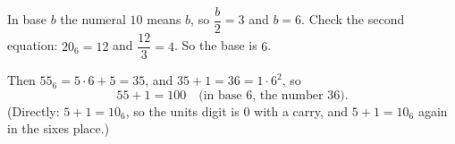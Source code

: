In base $b$ the numeral $10$ means $b$, so $\dfrac{b}{2}=3$ and $b=6$. Check the second equation: $20_6=12$ and $\dfrac{12}{3}=4$. So the base is $6$.

Then $55_6=5\cdot6+5=35$, and $35+1=36=1\cdot6^2$, so
\[55+1=\boxed{100}\quad\text{(in base }6\text{, the number }36\text{)}.\]
(Directly: $5+1=10_6$, so the units digit is $0$ with a carry, and $5+1=10_6$ again in the sixes place.)
